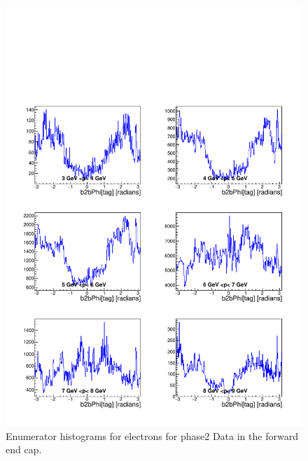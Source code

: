\documentclass[a4paper,11pt,twosided,final,german,openbib,pdftex,listof=totoc,bibliography=totoc]{scrbook}
\begin{document}
\begin{appendix}
\begin{figure}[!htbp]
	\centering
	\includegraphics[width=\textwidth]{Plots/master/xPMPhiemFCE_Data}
	\caption[Momentum $\phi$ Electron Forward End Cap Enumerator Histogram Phase2 Data]{Enumerator histograms for electrons for phase2 Data in the forward end cap.}
	\label{plt:PMPhiemFCE_Data}
\end{figure}


\end{appendix}
\end{document}
